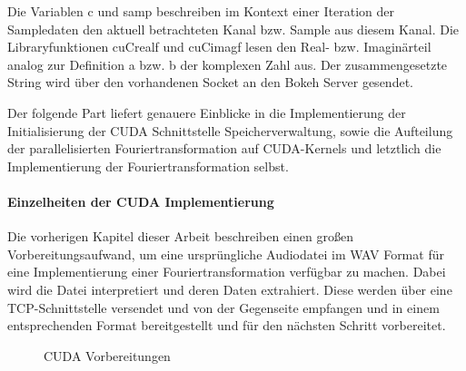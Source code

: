 Die Variablen c und samp beschreiben im Kontext einer Iteration der Sampledaten den aktuell betrachteten Kanal bzw. Sample aus diesem Kanal. Die Libraryfunktionen cuCrealf und cuCimagf lesen den Real- bzw. Imaginärteil analog zur Definition a bzw. b der komplexen Zahl aus. Der zusammengesetzte String wird über den vorhandenen Socket an den Bokeh Server gesendet.

Der folgende Part liefert genauere Einblicke in die Implementierung der Initialisierung der CUDA Schnittstelle Speicherverwaltung, sowie die Aufteilung der parallelisierten Fouriertransformation auf CUDA-Kernels und letztlich die Implementierung der Fouriertransformation selbst.

\paragraph{Einzelheiten der CUDA Implementierung}
Die vorherigen Kapitel dieser Arbeit beschreiben einen großen Vorbereitungsaufwand, um eine ursprüngliche Audiodatei im WAV Format für eine Implementierung einer Fouriertransformation verfügbar zu machen. Dabei wird die Datei interpretiert und deren Daten extrahiert. Diese werden über eine TCP-Schnittstelle versendet und von der Gegenseite empfangen und in einem entsprechenden Format bereitgestellt und für den nächsten Schritt vorbereitet.

\begin{figure}[t!]
	
	
	
	
	
	
	\caption{CUDA Vorbereitungen}
	\label{fig:cudaFourierTransform}
\end{figure}

